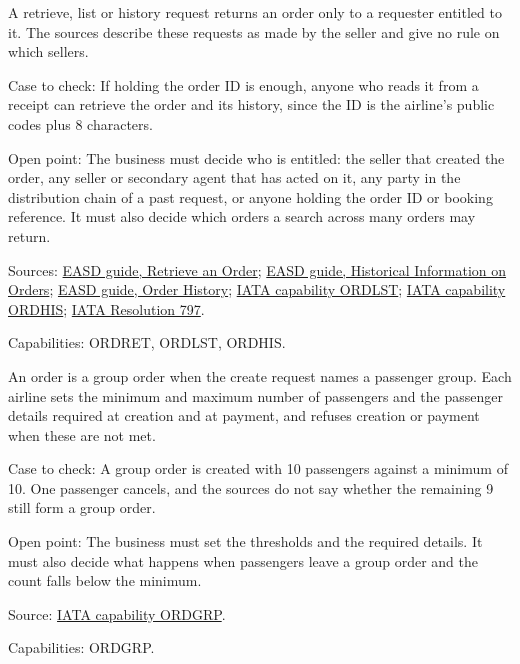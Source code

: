 \begin{definition}
  \label{def:order-creation-read-access}
  \notready
  A retrieve, list or history request returns an order only to a requester
  entitled to it. The sources describe these requests as made by the seller
  and give no rule on which sellers.

  Case to check: If holding the order ID is enough, anyone who reads it from
  a receipt can retrieve the order and its history, since the ID is the
  airline's public codes plus 8 characters.

  Open point: The business must decide who is entitled: the seller that
  created the order, any seller or secondary agent that has acted on it, any
  party in the distribution chain of a past request, or anyone holding the
  order ID or booking reference. It must also decide which orders a search
  across many orders may return.

  Sources: \href{https://standards.atlassian.net/wiki/spaces/EASD/pages/574455891/Retrieve+an+Order}{EASD guide, Retrieve an Order};
  \href{https://standards.atlassian.net/wiki/spaces/EASD/pages/574816364/Historical+Information+on+Orders}{EASD guide, Historical Information on Orders};
  \href{https://standards.atlassian.net/wiki/spaces/EASD/pages/574652557/Order+History}{EASD guide, Order History};
  \href{https://retailing.iata.org/armi/docs/ORDLST/}{IATA capability ORDLST};
  \href{https://retailing.iata.org/armi/docs/ORDHIS/}{IATA capability ORDHIS};
  \href{https://www.iata.org/contentassets/72cbd60393ff42b5975d90ce9e049a7d/oneorder-resolution-797.pdf}{IATA Resolution 797}.

  Capabilities: ORDRET, ORDLST, ORDHIS.
\end{definition}

\begin{definition}
  \label{def:order-creation-group-order}
  \notready
  An order is a group order when the create request names a passenger group.
  Each airline sets the minimum and maximum number of passengers and the
  passenger details required at creation and at payment, and refuses
  creation or payment when these are not met.

  Case to check: A group order is created with 10 passengers against a
  minimum of 10. One passenger cancels, and the sources do not say whether
  the remaining 9 still form a group order.

  Open point: The business must set the thresholds and the required details.
  It must also decide what happens when passengers leave a group order and
  the count falls below the minimum.

  Source: \href{https://retailing.iata.org/armi/docs/ORDGRP/}{IATA capability ORDGRP}.

  Capabilities: ORDGRP.
\end{definition}

